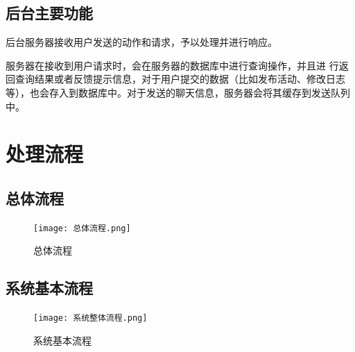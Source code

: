 \subsection{后台主要功能}
后台服务器接收用户发送的动作和请求，予以处理并进行响应。

服务器在接收到用户请求时，会在服务器的数据库中进行查询操作，并且进
行返回查询结果或者反馈提示信息，对于用户提交的数据（比如发布活动、修改日志等），也会存入到数据库中。对于发送的聊天信息，服务器会将其缓存到发送队列中。

\section{处理流程}
    \subsection{总体流程}
        \begin{figure}[ht]
            \centering
            \texttt{[image: 总体流程.png]}\label{tab:classification}
            \caption{总体流程}\label{fig:noted-figure}
        \end{figure}
        \newpage
    \subsection{系统基本流程}
        \begin{figure}[ht]
            \centering
            \texttt{[image: 系统整体流程.png]}\label{tab:classification}
            \caption{系统基本流程}\label{fig:noted-figure}
        \end{figure}
        \newpage
